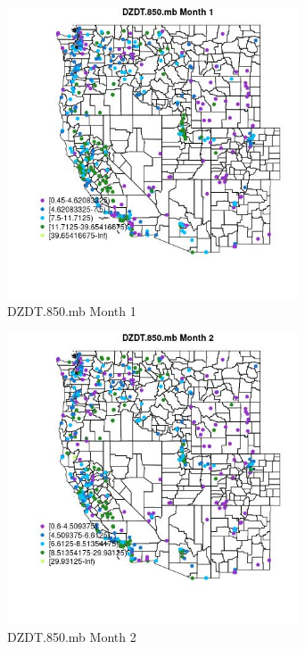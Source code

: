 \begin{figure} 
\centering  
\includegraphics[width=0.77\textwidth]{Code_Outputs/ML_input_report_ML_input_PM25_Step5_part_d_de_duplicated_aves_ML_input_MapObsMo1DZDT850mb.jpg} 
\caption{\label{fig:ML_input_report_ML_input_PM25_Step5_part_d_de_duplicated_aves_ML_inputMapObsMo1DZDT850mb}DZDT.850.mb Month 1} 
\end{figure} 
 

\begin{figure} 
\centering  
\includegraphics[width=0.77\textwidth]{Code_Outputs/ML_input_report_ML_input_PM25_Step5_part_d_de_duplicated_aves_ML_input_MapObsMo2DZDT850mb.jpg} 
\caption{\label{fig:ML_input_report_ML_input_PM25_Step5_part_d_de_duplicated_aves_ML_inputMapObsMo2DZDT850mb}DZDT.850.mb Month 2} 
\end{figure} 
 

